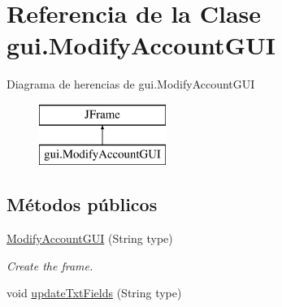 \hypertarget{classgui_1_1_modify_account_g_u_i}{}\section{Referencia de la Clase gui.\+Modify\+Account\+G\+UI}
\label{classgui_1_1_modify_account_g_u_i}
Diagrama de herencias de gui.\+Modify\+Account\+G\+UI\begin{figure}[H]
\begin{center}
\leavevmode
\includegraphics[height=2.000000cm]{classgui_1_1_modify_account_g_u_i}
\end{center}
\end{figure}
\subsection*{Métodos públicos}
\begin{DoxyCompactItemize}
\item 
\mbox{\hyperlink{classgui_1_1_modify_account_g_u_i_a6736caf57c7119ae2cdbb68ee38dd7bb}{Modify\+Account\+G\+UI}} (String type)
\begin{DoxyCompactList}\small\item\em Create the frame. \end{DoxyCompactList}\item 
void \mbox{\hyperlink{classgui_1_1_modify_account_g_u_i_afacb446b63aaccea7ffc445a726bea94}{update\+Txt\+Fields}} (String type)
\end{DoxyCompactItemize}
